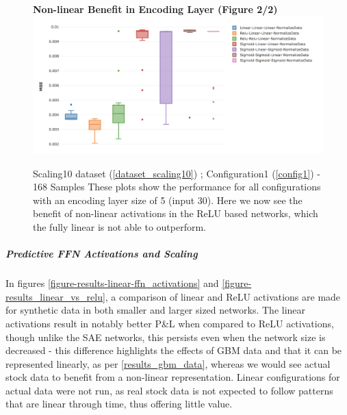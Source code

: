 \documentclass[a4paper,11pt,oneside]{article}
\theoremstyle{plain}
\theoremstyle{definition}
\begin{document}
\begin{figure}[H]
	\centering 
	\textbf{Non-linear Benefit in Encoding Layer (Figure 2/2)}
	\includegraphics[scale=0.4]{images/results/linearity/4Encoding_5_Activation_Combos_Min_MSE.png}
	\caption{Scaling10 dataset (\ref{dataset_scaling10}) ; Configuration1 (\ref{config1}) - 168 Samples
		\newline \newline These plots show the performance for all configurations with an encoding layer size of 5 (input 30). Here we now see the benefit of non-linear activations in the ReLU based networks, which the fully linear is not able to outperform.}
	\label{figure-results-encoding5}
\end{figure}

\subparagraph{Predictive FFN Activations and Scaling}

In figures \ref{figure-results-linear-ffn_activations} and \ref{figure-results_linear_vs_relu}, a comparison of linear and ReLU activations are made for synthetic data in both smaller and larger sized networks. The linear activations result in notably better P\&L when compared to ReLU activations, though unlike the SAE networks, this persists even when the network size is decreased - this difference highlights the effects of GBM data and that it can be represented linearly, as per \ref{results_gbm_data}, whereas we would see actual stock data to benefit from a non-linear representation. Linear configurations for actual data were not run, as real stock data is not expected to follow patterns that are linear through time, thus offering little value. \newline
\end{document}
